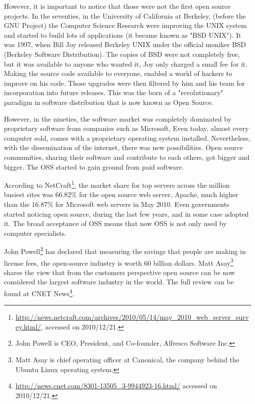However, it is important to notice that those were not the first open source projects. 
In the seventies, in the University of California at Berkeley, 
(before the GNU Project) the Computer Science Research 
were improving the UNIX system and started to build lots of applications (it became known as "BSD UNIX").
It was 1997, when Bill Joy released Berkeley UNIX under the official moniker BSD (Berkeley Software Distribution).
The copies of BSD were not completely free, but it was available to anyone who wanted it,
Joy only charged a small fee for it.
Making the source code available to everyone, enabled a world of hackers to improve on his code. 
Those upgrades were then filtered by him and his team for incorporation into future releases. 
This was the born of a "revolutionary" paradigm in software distribution that is now known as Open Source.

However, in the nineties, the software market was completely dominated 
by proprietary software from companies such as Microsoft,
Even today, almost every computer sold,
comes with a proprietary operating system installed.
Nevertheless, with the dissemination of the internet, there was new possibilities. 
Open source communities, sharing their software and contribute to each others, got bigger and bigger.
The OSS started to gain ground from paid software.

According to \textsf{NetCraft}\footnote{\url{http://news.netcraft.com/archives/2010/05/14/may\_2010\_web\_server\_survey.html/}, accessed on 2010/12/21.},
the market share for top servers across the million busiest sites was 66.82\% for the open source web server, Apache,
much higher than the 16.87\% for Microsoft web servers in May 2010.
Even governments started noticing open source, during the last few years, and in some case adopted it\cite{hahn2002government}.
The broad acceptance of OSS means that now OSS is not only used by computer specialists.

\textsf{John Powell}\footnote{John Powell is CEO, President, and Co-founder, Alfresco Software Inc.}
has declared that measuring the savings that people are making in license fees, the open-source industry is worth 60 billion dollars.
\textsf{Matt Asay}\footnote{Matt Asay is chief operating officer at Canonical, the company behind the Ubuntu Linux operating system.}
shares the view that from the customers perspective open source can be now considered the largest software industry in the world.
The full review can be found at \textsf{CNET News}\footnote{\url{http://news.cnet.com/8301-13505\_3-9944923-16.html/} accessed on 2010/12/21.}. 

